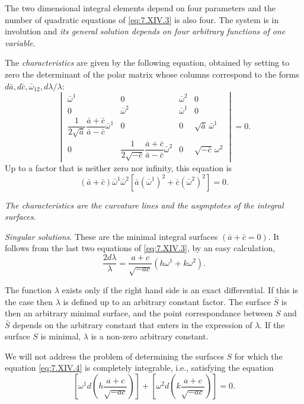 \documentclass[leqno,11pt]{book}
\numberwithin{equation}{chapter}
\theoremstyle{shape1}
\theoremstyle{shape0}
\theoremstyle{shape2}
\theoremstyle{definition}
\begin{document}
The two dimensional integral elements depend on four parameters and the number of quadratic equations of \eqref{eq:7.XIV.3} is also four. The system is in involution and \emph{its general solution depends on four arbitrary functions of one variable.}

The \emph{characteristics} are given by the following equation, obtained by setting to zero the determinant of the polar matrix whose columns correspond to the forms $d\bar a,d\bar c,\bar\omega_{12},d\lambda/\lambda$:
\[
\begin{vmatrix}
  \bar\omega^{1}&0&\bar\omega^{2}&0\\
  0&\bar\omega^{2}&\bar\omega^{1}&0\\
  \dfrac{1}{2\sqrt{\bar a}}\dfrac{\bar a+\bar c}{\bar a-\bar c}\bar\omega^{1}&0&0&\sqrt{\bar a}\,\bar\omega^{1}\\
  0&\dfrac{1}{2\sqrt{-\bar c}}\dfrac{\bar a+\bar c}{\bar a-\bar c}\bar\omega^{2}&0&\sqrt{-\bar c}\,\omega^{2}
\end{vmatrix}=0.
\]
Up to a factor that is neither zero nor infinity, this equation is
\[
(\bar a+\bar c)\bar \omega^{1}\bar \omega^{2}[\bar a(\bar\omega^{1})^{2}+\bar c(\bar \omega^{2})^{2}]=0.
\]

\emph{The characteristics are the curvature lines and the asymptotes of the integral surfaces}.

\vspace{12pt}\fsec\emph{Singular solutions}. These are the minimal integral surfaces $(\bar a+\bar c=0)$. It follows from the last two equations of \eqref{eq:7.XIV.3}, by an easy calculation,
\begin{equation}
  \label{eq:7.XIV.4}\tag{XIV, 4}
  \frac{2d\lambda}{\lambda}=\frac{a+c}{\sqrt{-ac}}(h\omega^{1}+k\omega^{2}).
\end{equation}

The function $\lambda$ exists only if the right hand side is an exact differential. If this is the case then $\lambda$ is defined up to an arbitrary constant factor. The surface $\bar S$ is then an arbitrary minimal surface, and the point correspondance between $S$ and $\bar S$ depends on the arbitrary constant that enters in the expression of $\lambda$. If the surface $S$ is minimal, $\lambda$ is a non-zero arbitrary constant.

We will not address the problem of determining the surfaces $S$ for which the equation \eqref{eq:7.XIV.4} is completely integrable, i.e., satisfying the equation
\[
\left[\omega^{1}d\left(h\frac{a+c}{\sqrt{-ac}}\right)\right]+\left[\omega^{2}d\left(k\frac{a+c}{\sqrt{-ac}}\right)\right]=0.
\]
\end{document}
